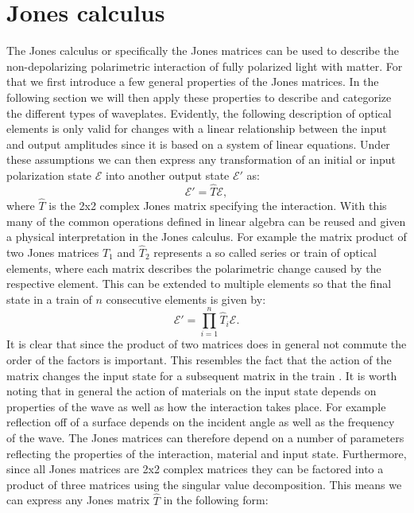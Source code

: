 
\section{Jones calculus}
\label{sec:jonescalc}
The Jones calculus or specifically the Jones matrices can be used to describe the non-depolarizing polarimetric interaction of fully polarized light with matter. For that we first introduce a few general properties of the Jones matrices. In the following section we will then apply these properties to describe and categorize the different types of waveplates. Evidently, the following description of optical elements is only valid for changes with a linear relationship between the input and output amplitudes since it is based on a system of linear equations. Under these assumptions we can then express any transformation of an initial or input polarization state $\bm{\mathcal{E}}$ into another output state $\bm{\mathcal{E}}'$ as:
\begin{equation}
    \bm{\mathcal{E}}' = \hat{T} \bm{\mathcal{E}},
\end{equation}
where $\hat{T}$ is the 2x2 complex Jones matrix specifying the interaction. With this many of the common operations defined in linear algebra can be reused and given a physical interpretation in the Jones calculus. For example the matrix product of two Jones matrices $\hat{T}_1$ and $\hat{T}_2$ represents a so called series or train of optical elements, where each matrix describes the polarimetric change caused by the respective element. This can be extended to multiple elements so that the final state in a train of $n$ consecutive elements is given by:
\begin{equation}
    \label{eq:jones_series_product}
    \bm{\mathcal{E}}' = \prod_{i=1}^{n} \hat{T}_i \bm{\mathcal{E}}.
\end{equation}
It is clear that since the product of two matrices does in general not commute the order of the factors is important. This resembles the fact that the action of the matrix changes the input state for a subsequent matrix in the train \cite{Jones1941ACalculus}. It is worth noting that in general the action of materials on the input state depends on properties of the wave as well as how the interaction takes place. For example reflection off of a surface depends on the incident angle as well as the frequency of the wave. The Jones matrices can therefore depend on a number of parameters reflecting the properties of the interaction, material and input state. Furthermore, since all Jones matrices are 2x2 complex matrices they can be factored into a product of three matrices using the singular value decomposition. This means we can express any Jones matrix $\hat{T}$ in the following form:
